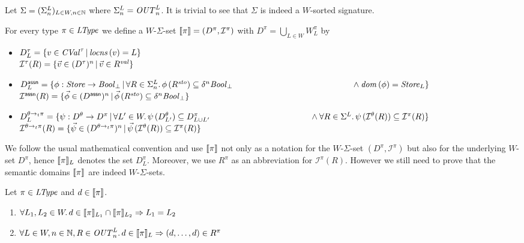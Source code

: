 \documentclass[12pt,a4paper]{report}
\newcommand{\CVal}{\nstyle{CVal}}
\newcommand{\sto}{\nstyle{sto}}
\newcommand{\val}{\nstyle{val}}
\newcommand{\OUT}{\nstyle{OUT}}
\newcommand{\I}{\mathcal{I}}
\begin{document}
Let $\Sigma = (\Sigma^L_n)_{L\in W,n\in \mathbb N}$ where $\Sigma^L_n = \OUT^L_n$. It is trivial to see
that $\Sigma$ is indeed a $W$-sorted signature.

\begin{definition}
  For every type $\pi\in\mathit{LType}$ we define a $W$-$\Sigma$-set $\semantic{\pi}=(D^\pi,\I^\pi)$
  with $D^\pi = \bigcup_{L\in W} W^\pi_L$ by
  \begin{itemize}
    \item $D^\tau_L = \{v\in\CVal^\tau\,|\,\locns{v} = L\}$ \\
          $\I^\tau(R) = \{\vec{v}\in(D^\tau)^n\,|\,\vec{v}\in R^\val\}$

    \item $D^\tassn_L = \{ \phi:\Store\to\Bool_\bot\,|\,
                              \forall R\in\Sigma^L_n.\,\phi\,(R^\sto) \subseteq \delta^n\Bool_\bot \\
                              \hspace*{5cm} \wedge \dom{\phi} = \Store_L
                         \}$ \\
          $\I^\tassn(R) = \{ \vec{\phi} \in (D^\tassn)^n\,|\,
                                  \vec{\phi}\,(R^\sto) \subseteq \delta^n \Bool_\bot \}$

    \item $D^{\ttarrow{\theta}{\pi}}_L = \{ \psi:D^\theta \to D^\pi\,|\,
                              \forall L'\in W.\, \psi\,(D^\theta_{L'}) \subseteq D^\pi_{L \cup L'} \\
                              \hspace*{4.2cm} \wedge \forall R\in\Sigma^L.\, \psi\,(\I^\theta(R))\subseteq\I^\pi(R)\}$ \\
          $\I^{\ttarrow{\theta}{\pi}}(R) = \{ \vec{\psi} \in (D^{\ttarrow{\theta}{\pi}})^n\,|\,
                                          \vec{\psi}\,(\I^\theta(R)) \subseteq \I^\pi(R) \}$
  \end{itemize}
\end{definition}

We follow the usual mathematical convention and use $\llbracket\pi\rrbracket$ not only as a notation
for the $W$-$\Sigma$-set $(D^\pi,\I^\pi)$ but also for the underlying $W$-set $D^\pi$,
hence $\llbracket\pi\rrbracket_L$ denotes the set $D^\pi_L$. Moreover, we use $R^\pi$ as an abbreviation
for $\I^\pi(R)$. However we still need to prove that the semantic domains $\llbracket\pi\rrbracket$
are indeed $W$-$\Sigma$-sets.

\begin{lemma}
  Let $\pi\in\mathit{LType}$ and $d \in \llbracket\pi\rrbracket$.
  \begin{enumerate}
    \item $\forall L_1,L_2\in W.\, d \in \llbracket\pi\rrbracket_{L_1} \cap \llbracket\pi\rrbracket_{L_2} \Rightarrow L_1 = L_2$
    \item $\forall L \in W, n \in \N, R\in \OUT^L_n.\, d \in \semantic{\pi}_L \Rightarrow (d,\ldots,d) \in R^\pi$
  \end{enumerate}
\end{lemma}
\end{document}
